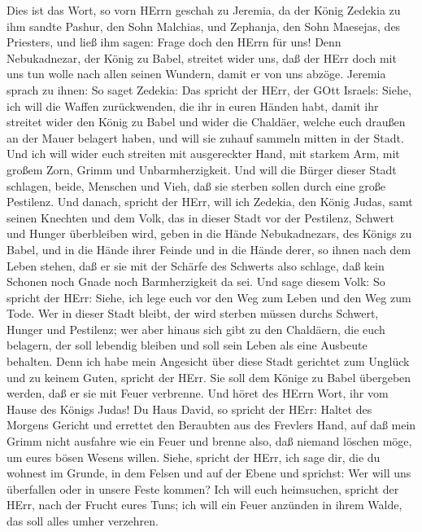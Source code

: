  Dies ist das Wort, so vorn HErrn geschah zu Jeremia, da der
König Zedekia zu ihm sandte Pashur, den Sohn Malchias, und Zephanja, den
Sohn Maesejas, des Priesters, und ließ ihm sagen:  Frage
doch den HErrn für uns! Denn Nebukadnezar, der König zu Babel, streitet
wider uns, daß der HErr doch mit uns tun wolle nach allen seinen
Wundern, damit er von uns abzöge.  Jeremia sprach zu ihnen:
So saget Zedekia:  Das spricht der HErr, der GOtt Israels:
Siehe, ich will die Waffen zurückwenden, die ihr in euren Händen habt,
damit ihr streitet wider den König zu Babel und wider die Chaldäer,
welche euch draußen an der Mauer belagert haben, und will sie zuhauf
sammeln mitten in der Stadt.  Und ich will wider euch
streiten mit ausgereckter Hand, mit starkem Arm, mit großem Zorn, Grimm
und Unbarmherzigkeit.  Und will die Bürger dieser Stadt
schlagen, beide, Menschen und Vieh, daß sie sterben sollen durch eine
große Pestilenz.  Und danach, spricht der HErr, will ich
Zedekia, den König Judas, samt seinen Knechten und dem Volk, das in
dieser Stadt vor der Pestilenz, Schwert und Hunger überbleiben wird,
geben in die Hände Nebukadnezars, des Königs zu Babel, und in die Hände
ihrer Feinde und in die Hände derer, so ihnen nach dem Leben stehen, daß
er sie mit der Schärfe des Schwerts also schlage, daß kein Schonen noch
Gnade noch Barmherzigkeit da sei.  Und sage diesem Volk: So
spricht der HErr: Siehe, ich lege euch vor den Weg zum Leben und den Weg
zum Tode.  Wer in dieser Stadt bleibt, der wird sterben
müssen durchs Schwert, Hunger und Pestilenz; wer aber hinaus sich gibt
zu den Chaldäern, die euch belagern, der soll lebendig bleiben und soll
sein Leben als eine Ausbeute behalten.  Denn ich habe mein
Angesicht über diese Stadt gerichtet zum Unglück und zu keinem Guten,
spricht der HErr. Sie soll dem Könige zu Babel übergeben werden, daß er
sie mit Feuer verbrenne.  Und höret des HErrn Wort, ihr vom
Hause des Königs Judas!  Du Haus David, so spricht der
HErr: Haltet des Morgens Gericht und errettet den Beraubten aus des
Frevlers Hand, auf daß mein Grimm nicht ausfahre wie ein Feuer und
brenne also, daß niemand löschen möge, um eures bösen Wesens willen.
 Siehe, spricht der HErr, ich sage dir, die du wohnest im
Grunde, in dem Felsen und auf der Ebene und sprichst: Wer will uns
überfallen oder in unsere Feste kommen?  Ich will euch
heimsuchen, spricht der HErr, nach der Frucht eures Tuns; ich will ein
Feuer anzünden in ihrem Walde, das soll alles umher verzehren.


